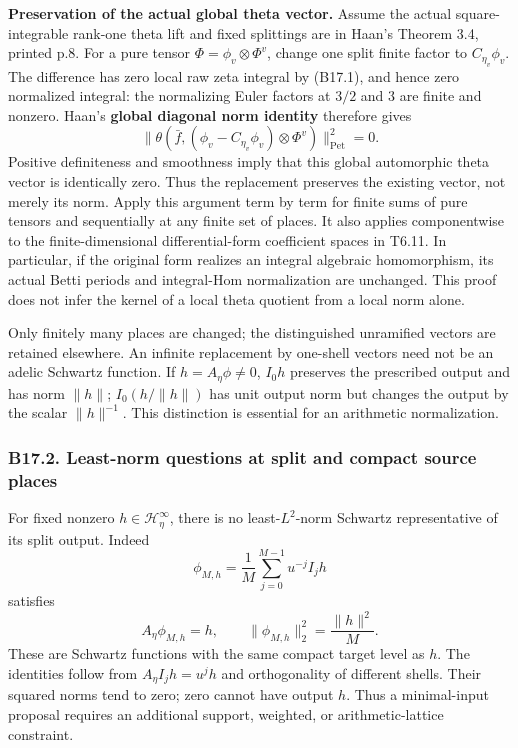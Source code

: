 \documentclass[11pt,a4paper]{article}
\theoremstyle{definition}
\begin{document}
\textbf{Preservation of the actual global theta vector.} Assume the actual square-integrable rank-one theta lift and fixed splittings are in Haan's Theorem 3.4, printed p.8. For a pure tensor \(\Phi=\phi_v\otimes\Phi^v\), change one split finite factor to \(C_{\eta_v}\phi_v\). The difference has zero local raw zeta integral by (B17.1), and hence zero normalized integral: the normalizing Euler factors at \(3/2\) and \(3\) are finite and nonzero. Haan's \textbf{global diagonal norm identity} therefore gives \[
 \|\theta(\bar f,(\phi_v-C_{\eta_v}\phi_v)\otimes\Phi^v)\|_{\mathrm{Pet}}^2=0.
\] Positive definiteness and smoothness imply that this global automorphic theta vector is identically zero. Thus the replacement preserves the existing vector, not merely its norm. Apply this argument term by term for finite sums of pure tensors and sequentially at any finite set of places. It also applies componentwise to the finite-dimensional differential-form coefficient spaces in T6.11. In particular, if the original form realizes an integral algebraic homomorphism, its actual Betti periods and integral-Hom normalization are unchanged. This proof does not infer the kernel of a local theta quotient from a local norm alone.

Only finitely many places are changed; the distinguished unramified vectors are retained elsewhere. An infinite replacement by one-shell vectors need not be an adelic Schwartz function. If \(h=A_\eta\phi\ne0\), \(I_0h\) preserves the prescribed output and has norm \(\|h\|\); \(I_0(h/\|h\|)\) has unit output norm but changes the output by the scalar \(\|h\|^{-1}\). This distinction is essential for an arithmetic normalization.

\subsubsection{B17.2. Least-norm questions at split and compact source places}\label{b17.2.-least-norm-questions-at-split-and-compact-source-places}

For fixed nonzero \(h\in\mathcal H_\eta^\infty\), there is no least-\(L^2\)-norm Schwartz representative of its split output. Indeed \[
 \phi_{M,h}=\frac1M\sum_{j=0}^{M-1}u^{-j}I_jh
\] satisfies \[
 A_\eta\phi_{M,h}=h,\qquad
 \|\phi_{M,h}\|_2^2=\frac{\|h\|^2}{M}.
\tag{B17.3}
\] These are Schwartz functions with the same compact target level as \(h\). The identities follow from \(A_\eta I_jh=u^jh\) and orthogonality of different shells. Their squared norms tend to zero; zero cannot have output \(h\). Thus a minimal-input proposal requires an additional support, weighted, or arithmetic-lattice constraint.
\end{document}
